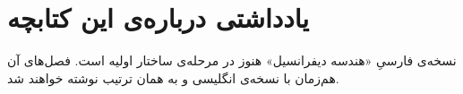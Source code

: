 \chapter*{یادداشتی درباره‌ی این کتابچه}

نسخه‌ی فارسیِ «هندسه دیفرانسیل» هنوز در مرحله‌ی ساختار اولیه است. فصل‌های آن هم‌زمان با نسخه‌ی انگلیسی و به همان ترتیب نوشته خواهند شد.
